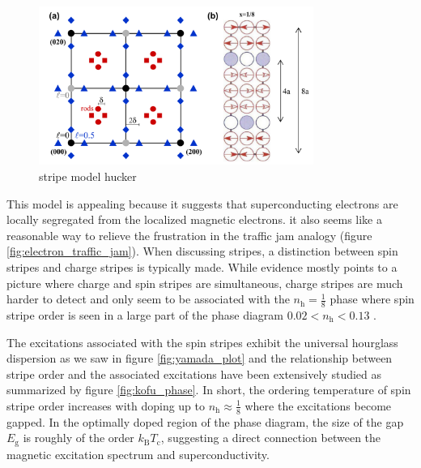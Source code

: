 \begin{figure}
    \centering
    \includegraphics[width=0.8\textwidth]{fig/intro/stripe_model_hucker.png}
    \caption[stripe model hucker]{stripe model hucker \cite{Hucker2012}}
    \label{fig:stripe_model_hucker}
\end{figure}

This model is appealing because it suggests that superconducting electrons are locally segregated from the localized magnetic electrons. it also seems like a reasonable way to relieve the frustration in the traffic jam analogy (figure \ref{fig:electron_traffic_jam}). When discussing stripes, a distinction between spin stripes and charge stripes is typically made. While evidence mostly points to a picture where charge and spin stripes are simultaneous, charge stripes are much harder to detect and only seem to be associated with the $n_\text{h} = \frac{1}{8}$ phase \cite{Christensen2014, Croft2014,Thampy2014} where spin stripe order is seen in a large part of the phase diagram $0.02 < n_\text{h} < 0.13$ \cite{Julien2003}.

The excitations associated with the spin stripes exhibit the universal hourglass dispersion as we saw in figure \ref{fig:yamada_plot} \cite{Tranquada2004a} and the relationship between stripe order and the associated excitations have been extensively studied as summarized by figure \ref{fig:kofu_phase}. In short, the ordering temperature of spin stripe order increases with doping up to $n_\text{h} \approx \frac{1}{8}$ where the excitations become gapped. In the optimally doped region of the phase diagram, the size of the gap $E_\text{g}$ is roughly of the order $k_\text{B} T_\text{c}$, suggesting a direct connection between the magnetic excitation spectrum and superconductivity.

